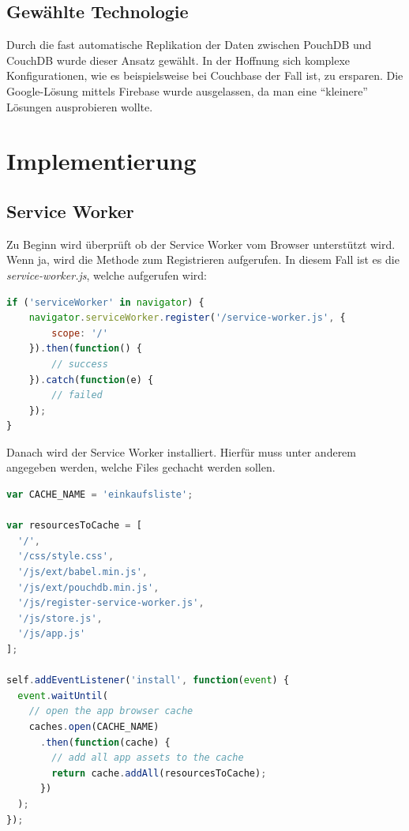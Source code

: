 

\subsection{Gewählte Technologie}

Durch die fast automatische Replikation der Daten zwischen PouchDB und CouchDB wurde dieser Ansatz gewählt. In der Hoffnung sich komplexe Konfigurationen, wie es beispielsweise bei Couchbase der Fall ist, zu ersparen. Die Google-Lösung mittels Firebase wurde ausgelassen, da man eine \enquote{kleinere} Lösungen ausprobieren wollte.

\section{Implementierung}

\subsection{Service Worker}

Zu Beginn wird überprüft ob der Service Worker vom Browser unterstützt wird. Wenn ja, wird die Methode zum Registrieren aufgerufen. In diesem Fall ist es die \textit{service-worker.js}, welche aufgerufen wird:

\begin{lstlisting}[language=JavaScript]
if ('serviceWorker' in navigator) {
    navigator.serviceWorker.register('/service-worker.js', {
        scope: '/'
    }).then(function() {
        // success
    }).catch(function(e) {
        // failed
    });
}

\end{lstlisting}

Danach wird der Service Worker installiert. Hierfür muss unter anderem angegeben werden, welche Files gechacht werden sollen.

\begin{lstlisting}[language=JavaScript]
var CACHE_NAME = 'einkaufsliste';

var resourcesToCache = [
  '/',
  '/css/style.css',
  '/js/ext/babel.min.js',
  '/js/ext/pouchdb.min.js',
  '/js/register-service-worker.js',
  '/js/store.js',
  '/js/app.js'
];

self.addEventListener('install', function(event) {
  event.waitUntil(
    // open the app browser cache
    caches.open(CACHE_NAME)
      .then(function(cache) {
        // add all app assets to the cache
        return cache.addAll(resourcesToCache);
      })
  );
});

\end{lstlisting}

